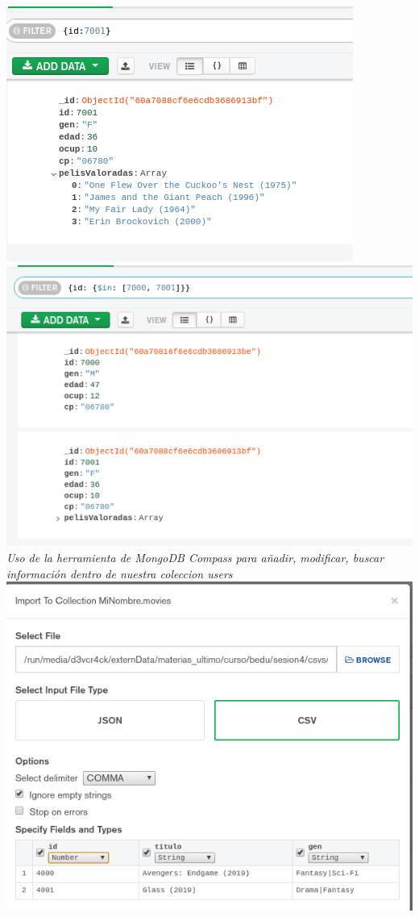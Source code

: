 \documentclass[10pt]{article}
\begin{document}
\begin{center}
  \includegraphics[scale=0.25]{imgs/17.png}\\
  \includegraphics[scale=0.25]{imgs/18.png}\\
  \textit{Uso de la herramienta de MongoDB Compass para añadir, modificar, buscar información dentro de nuestra coleccion users}\clearpage
  \includegraphics[scale=0.25]{imgs/19.png}\\

\end{center}
\end{document}
